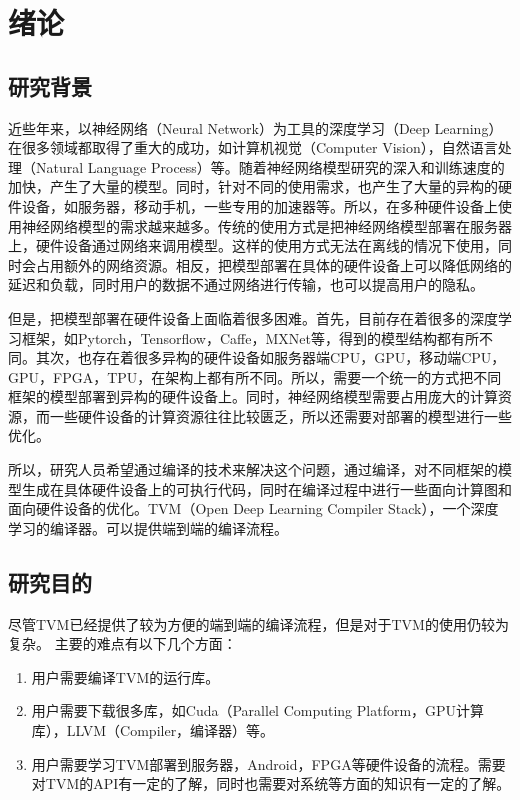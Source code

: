 \chapter{绪论}

\section{研究背景}

近些年来，以神经网络（Neural Network）为工具的深度学习（Deep Learning）在很多领域都取得了重大的成功，如计算机视觉（Computer Vision），自然语言处理（Natural Language Process）等。随着神经网络模型研究的深入和训练速度的加快，产生了大量的模型。同时，针对不同的使用需求，也产生了大量的异构的硬件设备，如服务器，移动手机，一些专用的加速器等。所以，在多种硬件设备上使用神经网络模型的需求越来越多。传统的使用方式是把神经网络模型部署在服务器上，硬件设备通过网络来调用模型。这样的使用方式无法在离线的情况下使用，同时会占用额外的网络资源。相反，把模型部署在具体的硬件设备上可以降低网络的延迟和负载，同时用户的数据不通过网络进行传输，也可以提高用户的隐私。

但是，把模型部署在硬件设备上面临着很多困难。首先，目前存在着很多的深度学习框架，如Pytorch，Tensorflow，Caffe，MXNet等，得到的模型结构都有所不同。其次，也存在着很多异构的硬件设备如服务器端CPU，GPU，移动端CPU，GPU，FPGA，TPU，在架构上都有所不同。所以，需要一个统一的方式把不同框架的模型部署到异构的硬件设备上。同时，神经网络模型需要占用庞大的计算资源，而一些硬件设备的计算资源往往比较匮乏，所以还需要对部署的模型进行一些优化。

所以，研究人员希望通过编译的技术来解决这个问题，通过编译，对不同框架的模型生成在具体硬件设备上的可执行代码，同时在编译过程中进行一些面向计算图和面向硬件设备的优化。TVM（Open Deep Learning Compiler Stack），一个深度学习的编译器。可以提供端到端的编译流程。

\section{研究目的}

尽管TVM已经提供了较为方便的端到端的编译流程，但是对于TVM的使用仍较为复杂。
主要的难点有以下几个方面：
\begin{enumerate}
    \item {用户需要编译TVM的运行库。}
    \item {用户需要下载很多库，如Cuda（Parallel Computing Platform，GPU计算库），LLVM（Compiler，编译器）等。}
    \item {用户需要学习TVM部署到服务器，Android，FPGA等硬件设备的流程。需要对TVM的API有一定的了解，同时也需要对系统等方面的知识有一定的了解。}
\end{enumerate}


